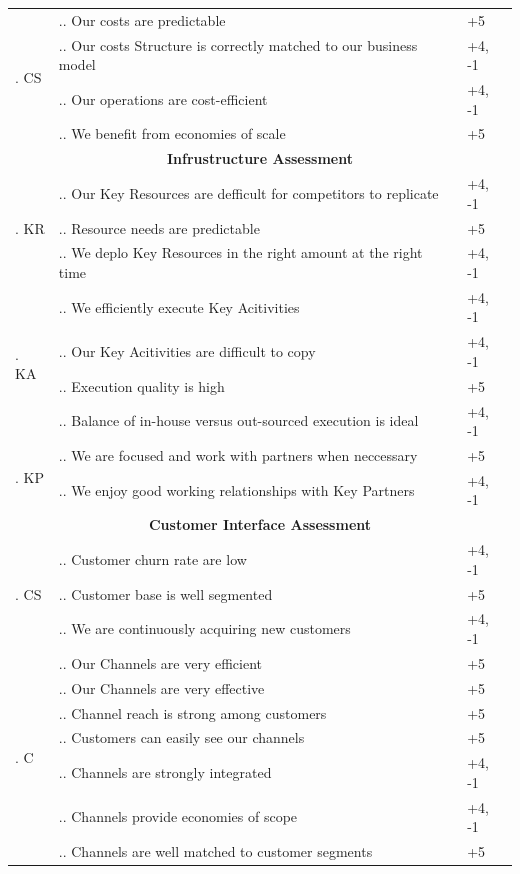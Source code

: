 \documentclass[dvipsnames, svgnames, x11names, 11pt]{article}
\newcounter{secq}
\newcommand{\seccnt}{\stepcounter{secq}\arabic{secq}. }
\newcounter{swotq}[secq]
\newcommand{\swotqcnt}{\stepcounter{swotq}\arabic{secq}.\arabic{swotq}. }
\begin{document}
\begin{latin}
\begin{center}
\begin{longtable}{p{}|p{}|p{}}
\multirow{4}{*}{\seccnt CS}
& \swotqcnt Our costs are predictable
& +5\\ \cline{2-3}
& \swotqcnt Our costs Structure is correctly matched to our business model
& +4, -1\\ \cline{2-3}
& \swotqcnt Our operations are cost-efficient
& +4, -1\\ \cline{2-3}
& \swotqcnt We benefit from economies of scale
& +5\\ 
\hline
\hline
\multicolumn{3}{c}{\textbf{Infrustructure Assessment}} \\
\hline
\hline
\multirow{3}{*}{\seccnt KR}
& \swotqcnt Our Key Resources are defficult for competitors to replicate 
& +4, -1\\ \cline{2-3}
& \swotqcnt Resource needs are predictable
& +5\\ \cline{2-3}
& \swotqcnt We deplo Key Resources in the right amount at the right time
& +4, -1\\ \hline

\multirow{4}{*}{\seccnt KA}
& \swotqcnt We efficiently execute Key Acitivities
& +4, -1\\ \cline{2-3}
& \swotqcnt Our Key Acitivities are difficult to copy
& +4, -1\\ \cline{2-3}
& \swotqcnt Execution quality is high
& +5\\ \cline{2-3}
& \swotqcnt Balance of in-house versus out-sourced execution is ideal
& +4, -1\\ \hline

\multirow{2}{*}{\seccnt KP}
& \swotqcnt We are focused and work with partners when neccessary
& +5\\ \cline{2-3}
& \swotqcnt We enjoy good working relationships with Key Partners
& +4, -1\\
\hline
\hline
\multicolumn{3}{c}{\textbf{Customer Interface Assessment}} \\
\hline
\hline
\multirow{3}{*}{\seccnt CS}
& \swotqcnt Customer churn rate are low
& +4, -1\\ \cline{2-3}
& \swotqcnt Customer base is well segmented
& +5\\ \cline{2-3}
& \swotqcnt We are continuously acquiring new customers
& +4, -1\\ \hline

\multirow{7}{*}{\seccnt C}
& \swotqcnt Our Channels are very efficient
& +5\\ \cline{2-3}
& \swotqcnt Our Channels are very effective
& +5\\ \cline{2-3}
& \swotqcnt Channel reach is strong among customers
& +5\\ \cline{2-3}
& \swotqcnt Customers can easily see our channels
& +5\\ \cline{2-3}
& \swotqcnt Channels are strongly integrated
& +4, -1\\ \cline{2-3}
& \swotqcnt Channels provide economies of scope
& +4, -1\\ \cline{2-3}
& \swotqcnt Channels are well matched to customer segments
& +5\\ \hline


\end{longtable}
\end{center}
\end{latin}
\end{document}
